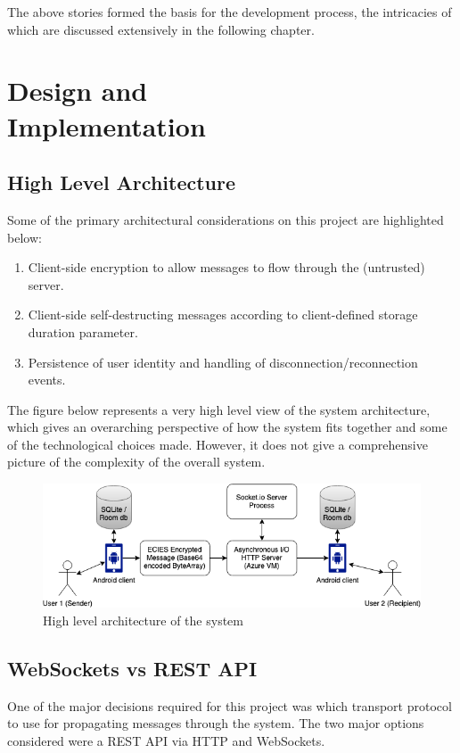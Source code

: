 \documentclass{mproj}
\begin{document}
The above stories formed the basis for the development process, the intricacies of which are discussed extensively in the following chapter.

\chapter{Design and \\ Implementation}\label{design}
\section{High Level Architecture}
Some of the primary architectural considerations on this project are highlighted below:
\begin{enumerate}
	\item Client-side encryption to allow messages to flow through the (untrusted) server.
	\item Client-side self-destructing messages according to client-defined storage duration parameter.
	\item Persistence of user identity and handling of disconnection/reconnection events.
\end{enumerate}
The figure below represents a very high level view of the system architecture, which gives an overarching perspective of how the system fits together and some of the technological choices made. However, it does not give a comprehensive picture of the complexity of the overall system.

\begin{figure}[h!]
\includegraphics[scale=0.5]{images/high-level-architecture.png}
\caption{High level architecture of the system}
\end{figure}

\section{WebSockets vs REST API}
One of the major decisions required for this project was which transport protocol to use for propagating messages through the system. The two major options considered were a REST API via HTTP\cite{masse2011rest} and WebSockets\cite{fette2011websocket}. 
\end{document}
